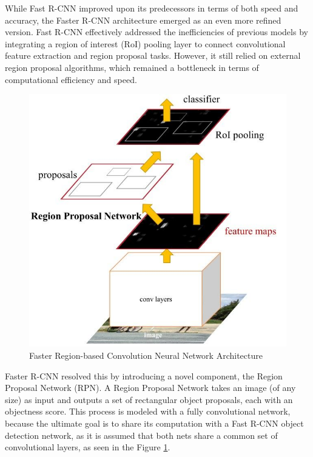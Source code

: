 While Fast R-CNN improved upon its predecessors in terms of both speed and accuracy, the Faster R-CNN  architecture \cite{frrcnn} emerged as an even more refined version. 
Fast R-CNN effectively addressed the inefficiencies of previous models by integrating a region of interest (RoI) pooling layer to connect convolutional 
feature extraction and region proposal tasks. However, it still relied on external region proposal algorithms, which remained a bottleneck in terms of 
computational efficiency and speed. 

\begin{figure}[h!]
    \centering
    \includegraphics[scale=0.4]{Figures/faster-rcnn.jpeg}
    \caption{Faster Region-based Convolution Neural Network Architecture \cite{frrcnn}}
    \label{fig:faster-rcnn}
\end{figure}

Faster R-CNN resolved this by introducing a novel component, the Region Proposal Network (RPN). A Region Proposal Network takes an image
(of any size) as input and outputs a set of rectangular object proposals, each with an objectness score. This process is modeled with a fully 
convolutional network, because the ultimate goal is to share its computation with a Fast R-CNN object detection network, as it is assumed that 
both nets share a common set of convolutional layers, as seen in the Figure \ref{fig:faster-rcnn}.


